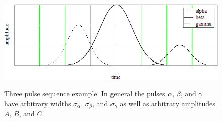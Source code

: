\begin{figure}
\centering
\includegraphics[width=5.00in]
{3_pulses/3_pulses.png}\\
\caption[Three pulse sequence example]{Three pulse sequence example. In general the pulses $\alpha$, $\beta$, and $\gamma$ have arbitrary widths $\sigma_\alpha$, $\sigma_\beta$, and $\sigma_\gamma$ as well as arbitrary amplitudes $A$, $B$, and $C$.}
\label{three pulses}
\end{figure} 

